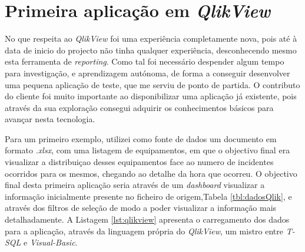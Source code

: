 \section{Primeira aplicação em \textit{QlikView}}
\par No que respeita ao \textit{QlikView} foi uma experiência completamente nova, pois até à data de inicio do projecto não tinha qualquer experiência, desconhecendo mesmo esta ferramenta de \textit{reporting}. Como tal foi necessário despender algum tempo para investigação, e aprendizagem autónoma, de forma a conseguir desenvolver uma pequena aplicação de teste, que me serviu de ponto de partida. O contributo do cliente foi muito importante ao disponibilizar uma aplicação já existente, pois através da sua exploração consegui adquirir os conhecimentos básicos para avançar nesta tecnologia.\newline
\par Para um primeiro exemplo, utilizei como fonte de dados um documento em formato \textit{.xlsx}, com uma listagem de equipamentos, em que o objectivo final era visualizar a distribuiçao desses equipamentos face ao numero de incidentes ocorridos para os mesmos, chegando ao detalhe da hora que ocorreu. O objectivo final desta primeira aplicação seria através de um \textit{dashboard} visualizar a informação inicialmente presente no ficheiro de origem,Tabela \ref{tbl:dadosQlik}, e através dos filtros de seleção de modo a poder visualizar a informação mais detalhadamente. A Listagem \ref{lst:qlikview} apresenta o carregamento dos dados para a aplicação, através da linguagem própria do \textit{QlikView}, um mistro entre \textit{T-SQL} e \textit{Visual-Basic}.\newline

